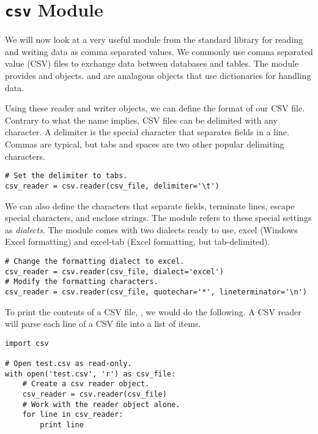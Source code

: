 \section*{\texttt{csv} Module}
We will now look at a very useful module from the standard library for reading and writing data as comma separated values. We commonly use comma separated value (CSV) files to exchange data between databases and tables.
The  module provides  and  objects.  and  are analagous objects that use dictionaries for handling data.

Using these reader and writer objects, we can define the format of our CSV file.
Contrary to what the name implies, CSV files can be delimited with any character.
A delimiter is the special character that separates fields in a line. Commas are typical, but tabs and spaces are two other popular delimiting characters.
\begin{lstlisting}
# Set the delimiter to tabs.
csv_reader = csv.reader(csv_file, delimiter='\t')
\end{lstlisting}

We can also define the characters that separate fields, terminate lines, escape special characters, and enclose strings.
The  module refers to these special settings as \emph{dialects}.
The module comes with two dialects ready to use, excel (Windows Excel formatting) and excel-tab (Excel formatting, but tab-delimited).
\begin{lstlisting}
# Change the formatting dialect to excel.
csv_reader = csv.reader(csv_file, dialect='excel')
# Modify the formatting characters.
csv_reader = csv.reader(csv_file, quotechar='*', lineterminator='\n')

\end{lstlisting}

To print the contents of a CSV file, , we would do the following.  A CSV reader will parse each line of a CSV file into a list of items.
\begin{lstlisting}
import csv

# Open test.csv as read-only.
with open('test.csv', 'r') as csv_file:
    # Create a csv reader object.
    csv_reader = csv.reader(csv_file)
    # Work with the reader object alone.
    for line in csv_reader:
        print line
\end{lstlisting}

